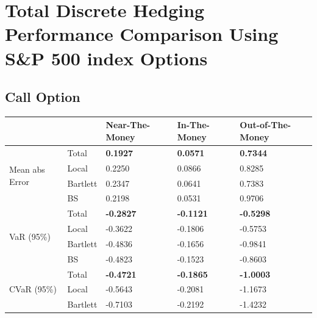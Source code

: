 \documentclass[letterpaper,12pt,titlepage,oneside,final]{book}
\numberwithin{equation}{section}
\theoremstyle{definition}
\begin{document}
\newpage
\section{Total Discrete Hedging Performance Comparison Using  S\&P 500 index Options}
\subsection{Call Option}
\begin{table}[htp!]
	\centering
    \begin{tabular}{ll|l|l|l|}
    \cline{3-5}
                                                          &          & Near-The-Money   & In-The-Money     & Out-of-The-Money \\ \hline
    \multicolumn{1}{|l|}{\multirow{4}{*}{Mean abs Error}} & Total    & \textbf{0.1927}  & \textbf{0.0571}  & \textbf{0.7344}  \\  
    \multicolumn{1}{|l|}{}                                & Local    & 0.2250           & 0.0866           & 0.8285           \\  
    \multicolumn{1}{|l|}{}                                & Bartlett & 0.2347           & 0.0641           & 0.7383           \\  
    \multicolumn{1}{|l|}{}                                & BS       & 0.2198           & 0.0531           & 0.9706           \\ \hline
    \multicolumn{1}{|l|}{\multirow{4}{*}{VaR (95\%)}}     & Total    & \textbf{-0.2827} & \textbf{-0.1121} & \textbf{-0.5298} \\  
    \multicolumn{1}{|l|}{}                                & Local    & -0.3622          & -0.1806          & -0.5753          \\  
    \multicolumn{1}{|l|}{}                                & Bartlett & -0.4836          & -0.1656          & -0.9841          \\  
    \multicolumn{1}{|l|}{}                                & BS       & -0.4823          & -0.1523          & -0.8603          \\ \hline
    \multicolumn{1}{|l|}{\multirow{4}{*}{CVaR (95\%)}}    & Total    & \textbf{-0.4721} & \textbf{-0.1865} & \textbf{-1.0003} \\  
    \multicolumn{1}{|l|}{}                                & Local    & -0.5643          & -0.2081          & -1.1673          \\  
    \multicolumn{1}{|l|}{}                                & Bartlett & -0.7103          & -0.2192          & -1.4232          \\  

\end{tabular}
\end{table}
\end{document}
